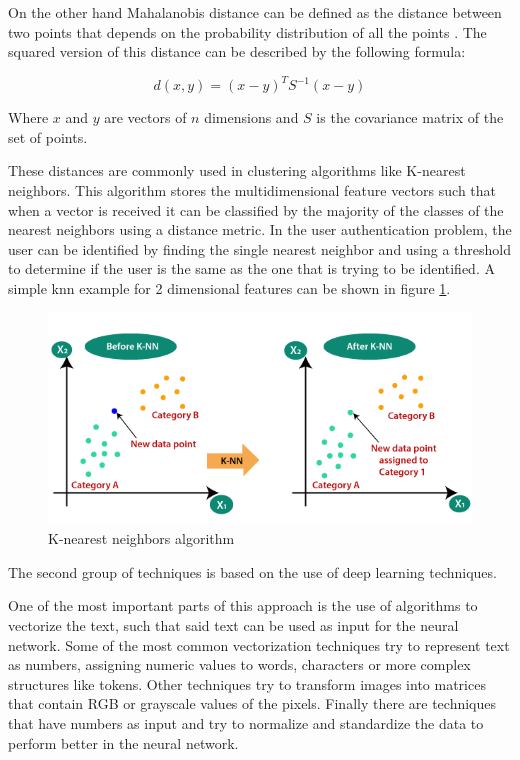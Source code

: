 On the other hand Mahalanobis distance can be defined as the distance between two points that depends on the probability distribution of all the points \cite{de2000mahalanobis}. The squared version of this distance can be described by the following formula:

\begin{equation}
	d(x,y) = (x-y)^T S^{-1} (x-y)
	\label{eq:mahalanobis}
\end{equation}

Where $x$ and $y$ are vectors of $n$ dimensions and $S$ is the covariance matrix of the set of points.


These distances are commonly used in clustering algorithms like K-nearest neighbors. This algorithm stores the multidimensional feature vectors such that when a vector is received it can be classified by the majority of the classes of the nearest neighbors using a distance metric. In the user authentication problem, the user can be identified by finding the single nearest neighbor and using a threshold to determine if the user is the same as the one that is trying to be identified. A simple knn example for 2 dimensional features can be shown in figure \ref{fig:knn}.

\begin{figure}[h]
    \centering
    \includegraphics[width=0.7\linewidth]{images/knn}
    \caption{K-nearest neighbors algorithm \cite{knn}}
    \label{fig:knn}
\end{figure}

The second group of techniques is based on the use of deep learning techniques.

One of the most important parts of this approach is the use of algorithms to vectorize the text, such that said text can be used as input for the neural network. Some of the most common vectorization techniques try to represent text as numbers, assigning numeric values to words, characters or more complex structures like tokens. Other techniques try to transform images into matrices that contain RGB or grayscale values of the pixels. Finally there are techniques that have numbers as input and try to normalize and standardize the data to perform better in the neural network.

